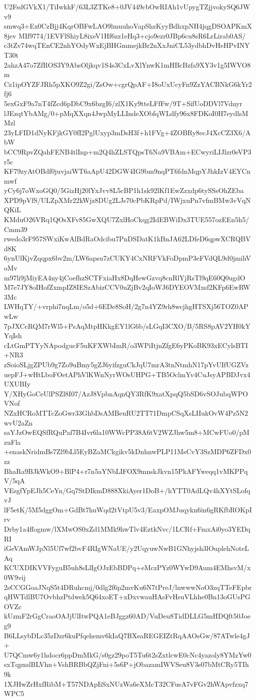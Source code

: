 U2FsdGVkX1/TiIwkkF/63L3ZTKe8+0JV449cbOwRIAh1vUpygTZjjvokySQ6JWv9
smwq3+Ex0CzBjj4KqrOBFwLAO9lmuuhoVapShzKyyBdhxpNH4jqgDSOAPKmX8jev
MIf9774/1EVFlShiyL8ixeV1Hf6zz1eHq3+cjo9ezr0JBp6cu8sR6LrLirab0AS/
c3tZv74wqTEnCE2nhYOdyWxEjBHGmmejkBr2nXxJniCL53ydbhDvHeHPvINYT30t
2ahzA47o7ZfROS3Y9AbsOljkqv1S4s3CxLvXlYnwK1mHBcBzfa9XY3v1g5IWVO8m
Cz1ipOYZFJRh5pXKO9Z2gi/ZsOw+cgrQpAF+I8oUxUcyFn9ZzYACBNkG6kYr2fj6
5exGxF9a7nT4fZcd6pDbC9x6bzgI6/zlX1Ky9tteLFfFw/9T+SifUoDDVl7Vdnyr
lJEzqtYbAMg/0+pMqXXqn4JwpMyLLIndeXObfqWLdfy96x8FDKoI0H7eydlsMMzl
23yLFID1dNyKFjkGY0fI2PglUxyp3mDsH3f+h1FVg+4ZOBRy8ecJ4XcCZ3X6/AbW
bCC9RpvZQahFENB4tlInp+m2Q4hZLSTQpsT6Na9VBAm+ECwyriLIJlzr0eVP3r5c
KF79zyAtOBdf0juvjaiWT6aApU42DGW4IG9bm9nqPT6fdnMqpYJhkIzV4EYCnmwf
yCy6j7oWxoGQ0/5GizHj20lYxJvv8L5cBP1h1sk92lKf1EwZzxdp6tySSsOhZEba
XPD9pVfS/ULZpXMr22kWjz8DUg2LJs70cPbKRpPd/IWjxuPn7vfmBMw3vVqNQKiL
KMduO26VRq1QOsXFv85GwXQU7ZxlHoCkqg2IdEBWiDx3TUE557ozEEn5h5/Cmm39
rwedo3rF957SWxiKwAlBdRaOdcibu7PnDSDatK1kBnJA62LDfeD6qpwXCRQBVd8K
6ynUfKjvZqqpx6bv2m/LW6apsu7zCUKY4CxNRFVkFoDpmP3eFVdQL9d0jmihVoMv
m97li9jMiyEA4ny4jCoefhzSCTFxiaHx8DqHewGzvq8cnRlYjRsTl9qE60Q0ugdO
M7e7JY8oIHofZxmpIZ8IESzAbizCCV0uZjBv2qIoWJ6DYEOVMxsf2KFp6EwRW3Mc
LWHqTY/+vrphi7nqLm/o5d+6EDe8SoH/2g7n4YZ9rh8wcjhgHTSXj56TOZ0APwLw
7pJXCcRQM7rWl5+PsAqMtpHKkgEY1lG6b/sLGqI3CXO/B/5RS8pAV2YH0kYYqIsh
cLtGmPTYyNApodgucF5uKFXWbImR/o3WPiItjnZfgE6yPKoBK93xECylsBTI+NR3
zSoioSLjgZPUb9g7Zo9uBmy5gZJ6yifzguCkJqU7mrA3tnNtmhN17pYvUIfUGZVz
uepFJ+wHtLboFOetAPhVlKWnNyrWOsUHPG+TB5OclmYv4CuJsyAPBDJvx4UXUBIy
Y/XHyGoCeUlPSZl8I07/AzJ8VpbnAqnQY3RfK9xatXpqQ5bSD6vSOJubqWPOVNof
NZxHCRoMTTcZoGwr33GhbDsAMBeuRU2TT71DmpCSqXsLIIukOvW4Pz5N2wvU2aZn
saYJzOwEQSfRQuPaf7B4Ivr6la10WWcPP38A6tV2WZJhw5m8+MCwFUo0/pMzuFla
+enaskNridmBs7Zl9bLl5EyBZaMCkgikv5kDnhnwPLP11MsCvY3SzMDP6ZFDx0zz
BhaRa9BJkWkO9+BlP4+r7n5aYNbLIFOX9mnskJkvn15PkAFYweqq1vMKPPqV/5qA
VEsgfYpEJh5CeYn/Gq7StDIkmD888XkiAyer1DoB+/hYTT0AdLQv4hXYtSLofqvJ
lF5etK/5M5dggOm+GdBt7huWqd2tVtpU5v3/EaxpOMJuqykn6in6gRKfbROKpIrv
Drby1a4ffogmw/lXMwOS0xZd1MMk9hwTlv4EztkNvc/1LCRf+FmxAi0yo3YEDqRI
iGeVAmWJpNl5Uf7wf2bvF4RIgWNaUE/y2UqyuwNwB1GNhyjsh3lOuplehNoteLAq
KCUXDIKVVFyguB5uh8sLlIgOJzEbBDPq+eMczPYz0WYwD9Aum4EMhsvM/x0W9vij
2sCCGGoaJNqS5t4DRuhcmj/0dlg2f6p2mvKu6N7tPreJ/lnwwwNoO3zqTTeFEpbr
qHWTdlBU7OvbhzPtdwek5Q64xoET+xDxvwauHAsFvHsuVLhhe0Bn13oGUsPGOVZc
kUzmF2rGgCraoOAJjUlItwPQA1eBJggz60AD/VuDeu8TidDLLG5mHDQft50Joeg9
B6LLsybDLc35zDzr6kuPfqehemv6kIaQ7BXeaREGEIZtRqAAOsGw/87ATwle4gJ+
U7QCmw6y1hdocr6ppDmMkG/s0gz29poT5Tu6t2sZxtlcwE0cNc4yazoly8YMzYw0
sxTqpxslBLVhn+VshBRBbQZjFni+5s6P+jObazamIWVSeu8V3s07bMtCRy5TIh9k
1XJHwZrHxfRibM+T57NDApIiSxNUzWa6eXMcT32CFusA7vFGv2hWApvfzxq7WPC5
